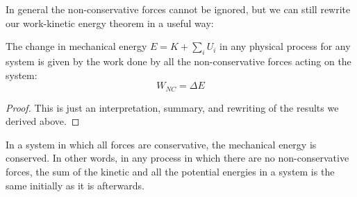 

In general the non-conservative forces cannot be ignored, but we can still rewrite our work-kinetic energy theorem in a useful way:
\begin{theorem}
The change in mechanical energy $E = K + ∑_i U_i$ in any physical process for any system is given by the work done by all the non-conservative forces acting on the system:
$$
W_{NC} = ΔE
$$
\end{theorem}
\begin{proof}
This is just an interpretation, summary, and rewriting of the results we derived above. 
\end{proof}

\begin{corollary}
In a system in which all forces are conservative, the mechanical energy is conserved. In other words, in any process in which there are no non-conservative forces, the sum of the kinetic and all the potential energies in a system is the same initially as it is afterwards.
\end{corollary}

